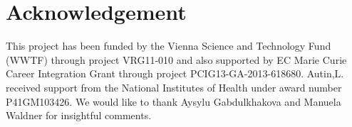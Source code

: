 \section{Acknowledgement}

This project has been funded by the Vienna Science and Technology Fund (WWTF) through project VRG11-010 and also supported by EC Marie Curie Career Integration Grant through project PCIG13-GA-2013-618680. 
Autin,L. received support from the National Institutes of Health under award number P41GM103426. We would like to thank Aysylu Gabdulkhakova and Manuela Waldner for insightful comments.
